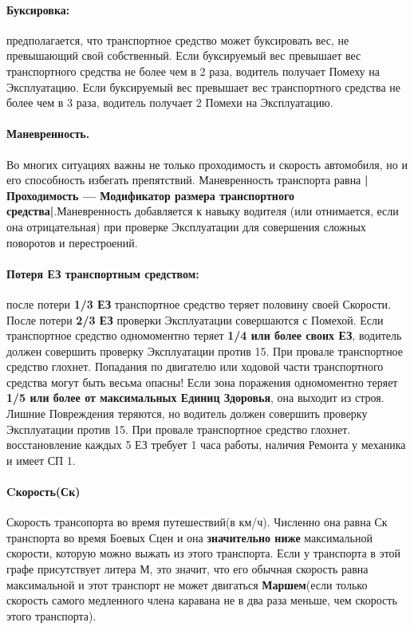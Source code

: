 \paragraph{Буксировка:} предполагается, что транспортное средство может буксировать вес, не превышающий свой собственный. Если буксируемый вес превышает вес транспортного средства не более чем в 2 раза, водитель получает Помеху на Эксплуатацию. Если буксируемый вес превышает вес транспортного средства не более чем в 3 раза, водитель получает 2 Помехи на Эксплуатацию.
\paragraph{Маневренность.} Во многих ситуациях важны не только проходимость и скорость автомобиля, но и его способность избегать препятствий. Маневренность транспорта равна \textbf{|Проходимость — Модификатор размера транспортного средства|}.Маневренность добавляется к навыку
водителя (или отнимается, если она отрицательная) при проверке Эксплуатации для совершения сложных поворотов и перестроений.
\paragraph{Потеря ЕЗ транспортным средством:} после потери \textbf{1/3 ЕЗ}
транспортное средство теряет половину своей Скорости. После
потери \textbf{2/3 ЕЗ} проверки Эксплуатации совершаются с Помехой.
\newline
Если транспортное средство одномоментно теряет \textbf{1/4 или более своих ЕЗ}, водитель должен совершить проверку Эксплуатации против 15. При провале транспортное средство глохнет.
\newline
Попадания по двигателю или ходовой части транспортного средства могут быть весьма опасны! Если зона поражения одномоментно теряет \textbf{1/5 или более от максимальных Единиц Здоровья}, она выходит из строя. Лишние Повреждения теряются, но водитель должен совершить проверку Эксплуатации против 15. При провале транспортное средство глохнет.
 восстановление каждых 5 ЕЗ требует 1 часа работы, наличия Ремонта у механика и имеет СП 1.

\paragraph{Cкорость(Ск)} Скорость трансопорта во время путешествий(в км/ч). Численно она равна Ск транспорта во время Боевых Сцен и она \textbf{значительно ниже} максимальной скорости, которую можно выжать из этого транспорта. Если у транспорта в этой графе присутствует литера М, это значит, что его обычная скорость равна максимальной и этот транспорт не может двигаться \textbf{Маршем}(если только скорость самого медленного члена каравана не в два раза меньше, чем скорость этого транспорта).
